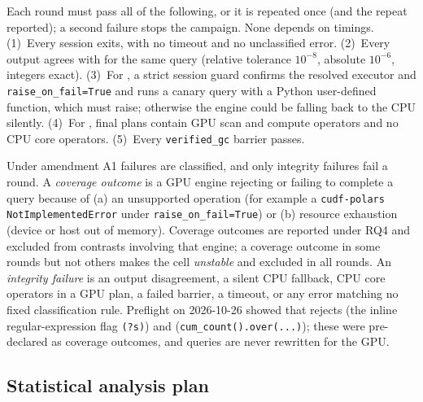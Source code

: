 \documentclass[sigconf, nonacm]{acmart}
\begin{document}
Each round must pass all of the following, or it is repeated once (and the
repeat reported); a second failure stops the campaign. None depends on
timings. (1)~Every session exits, with no timeout and no unclassified error.
(2)~Every output agrees with \polarscpu{} for the same query (relative
tolerance $10^{-8}$, absolute $10^{-6}$, integers exact). (3)~For
\polarsgpu{}, a strict session guard confirms the resolved executor and
\texttt{raise\_on\_fail=True} and runs a canary query with a Python
user-defined function, which must raise; otherwise the engine could be falling
back to the CPU silently. (4)~For \sparkgpu{}, final plans contain GPU scan and
compute operators and no CPU core operators. (5)~Every \texttt{verified\_gc}
barrier passes.

Under amendment A1 failures are classified, and only integrity failures fail a
round. A \emph{coverage outcome} is a GPU engine rejecting or failing to
complete a query because of (a) an unsupported operation (for example a
\texttt{cudf-polars} \texttt{NotImplementedError} under
\texttt{raise\_on\_fail=True}) or (b) resource exhaustion (device or host out of
memory). Coverage outcomes are reported under RQ4 and excluded from contrasts
involving that engine; a coverage outcome in some rounds but not others makes
the cell \emph{unstable} and excluded in all rounds. An \emph{integrity
failure} is an output disagreement, a silent CPU fallback, CPU core operators
in a GPU plan, a failed barrier, a timeout, or any error matching no fixed
classification rule. Preflight on 2026-10-26 showed that \polarsgpu{} rejects
 (the inline regular-expression flag \texttt{(?s)}) and
 (\texttt{cum\_count().over(...)}); these were pre-declared as
coverage outcomes, and queries are never rewritten for the GPU.

\subsection{Statistical analysis plan}
\label{sec:stats}
\end{document}
